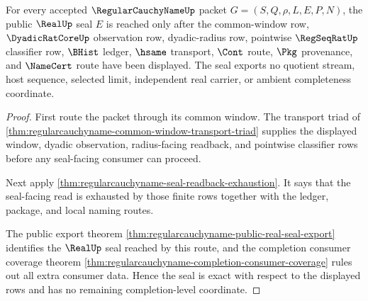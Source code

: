 \begin{theorem}
\label{thm:regularcauchyname-real-seal-exactness}
For every accepted $\RegularCauchyNameUp$ packet $G=(S,Q,\rho,L,E,P,N)$, the public $\RealUp$ seal $E$ is reached only after the common-window row, $\DyadicRatCoreUp$ observation row, dyadic-radius row, pointwise $\RegSeqRatUp$ classifier row, $\BHist$ ledger, $\hsame$ transport, $\Cont$ route, $\Pkg$ provenance, and $\NameCert$ route have been displayed. The seal exports no quotient stream, host sequence, selected limit, independent real carrier, or ambient completeness coordinate.
\end{theorem}
\begin{proof}
First route the packet through its common window. The transport triad of \autoref{thm:regularcauchyname-common-window-transport-triad} supplies the displayed window, dyadic observation, radius-facing readback, and pointwise classifier rows before any seal-facing consumer can proceed.

Next apply \autoref{thm:regularcauchyname-seal-readback-exhaustion}. It says that the seal-facing read is exhausted by those finite rows together with the ledger, package, and local naming routes.

The public export theorem \autoref{thm:regularcauchyname-public-real-seal-export} identifies the $\RealUp$ seal reached by this route, and the completion consumer coverage theorem \autoref{thm:regularcauchyname-completion-consumer-coverage} rules out all extra consumer data. Hence the seal is exact with respect to the displayed rows and has no remaining completion-level coordinate.
\end{proof}

